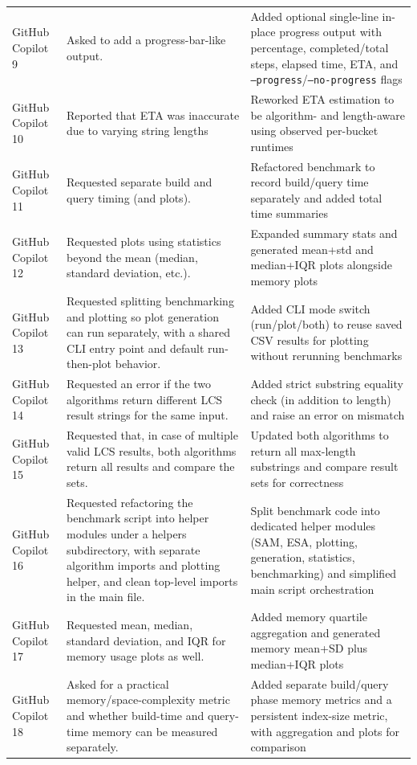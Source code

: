 {\begin{longtable}{p{} p{} p{}}
    GitHub Copilot 9 & Asked to add a progress-bar-like output. & Added optional single-line in-place progress output with percentage, completed/total steps, elapsed time, ETA, and \texttt{--progress}/\texttt{--no-progress} flags \\
    GitHub Copilot 10 & Reported that ETA was inaccurate due to varying string lengths & Reworked ETA estimation to be algorithm- and length-aware using observed per-bucket runtimes\\
    GitHub Copilot 11 & Requested separate build and query timing (and plots). & Refactored benchmark to record build/query time separately and added total time summaries \\
    GitHub Copilot 12 & Requested plots using statistics beyond the mean (median, standard deviation, etc.). & Expanded summary stats and generated mean+std and median+IQR plots alongside memory plots \\
    GitHub Copilot 13 & Requested splitting benchmarking and plotting so plot generation can run separately, with a shared CLI entry point and default run-then-plot behavior. & Added CLI mode switch (run/plot/both) to reuse saved CSV results for plotting without rerunning benchmarks \\
    GitHub Copilot 14 & Requested an error if the two algorithms return different LCS result strings for the same input. & Added strict substring equality check (in addition to length) and raise an error on mismatch \\
    GitHub Copilot 15 & Requested that, in case of multiple valid LCS results, both algorithms return all results and compare the sets. & Updated both algorithms to return all max-length substrings and compare result sets for correctness \\
    GitHub Copilot 16 & Requested refactoring the benchmark script into helper modules under a helpers subdirectory, with separate algorithm imports and plotting helper, and clean top-level imports in the main file. & Split benchmark code into dedicated helper modules (SAM, ESA, plotting, generation, statistics, benchmarking) and simplified main script orchestration \\
    GitHub Copilot 17 & Requested mean, median, standard deviation, and IQR for memory usage plots as well. & Added memory quartile aggregation and generated memory mean+SD plus median+IQR plots \\
    GitHub Copilot 18 & Asked for a practical memory/space-complexity metric and whether build-time and query-time memory can be measured separately. & Added separate build/query phase memory metrics and a persistent index-size metric, with aggregation and plots for comparison \\

\end{longtable}}
